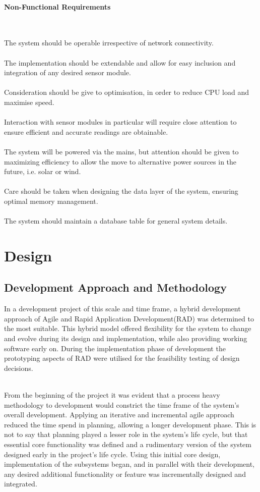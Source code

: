 \documentclass{article}
\begin{document}
\paragraph*{Non-Functional Requirements}\

The system should be operable irrespective of network connectivity. \\\\ The implementation should be extendable and allow for easy inclusion and integration of any desired sensor module. \\\\ Consideration should be give to optimisation, in order to reduce CPU load and maximise speed. \\\\ Interaction with sensor modules in particular will require close attention to ensure efficient and accurate readings are obtainable. \\\\ The system will be powered via the mains, but attention should be given to maximizing efficiency to allow the move to alternative power sources in the future, i.e. solar or wind. \\\\ Care should be taken when designing the data layer of the system, ensuring optimal memory management. \\\\ The system should maintain a database table for general system details.

\section{Design}
\subsection{Development Approach and Methodology}
In a development project of this scale and time frame, a hybrid development approach of Agile and Rapid Application Development(RAD) was determined to the most suitable. This hybrid model offered flexibility for the system to change and evolve during its design and implementation, while also providing working software early on. During the implementation phase of development the prototyping aspects of RAD were utilised for the feasibility testing of design decisions. \\\

From the beginning of the project it was evident that a process heavy methodology to development would constrict the time frame of the system’s overall development. Applying an iterative and incremental agile approach reduced the time spend in planning, allowing a longer development phase. This is not to say that planning played a lesser role in the system’s life cycle, but that essential core functionality was defined and a rudimentary version of the system designed early in the project\rq s life cycle. Using this initial core design, implementation of the subsystems began, and in parallel with their development, any desired additional functionality or feature was incrementally designed and integrated.
\end{document}
